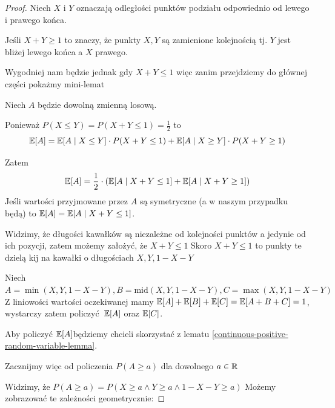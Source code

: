 \begin{proof}
	Niech \(X\) i \(Y\) oznaczają odległości punktów podziału odpowiednio od lewego i prawego końca.

	Jeśli \(X + Y \geq 1\) to znaczy, że punkty \(X, Y\) są zamienione kolejnością tj. \(Y\) jest bliżej lewego końca a \(X\) prawego.

	Wygodniej nam będzie jednak gdy \(X + Y \leq 1\) więc zanim przejdziemy do głównej części pokażmy mini-lemat

	Niech \(A\) będzie dowolną zmienną losową.

	Ponieważ \(P(X \leq Y) = P(X + Y \leq 1) = \frac{1}{2} \) to
	\[
		\expected{A} =
		\expected{A \mid X \leq Y} \cdot P(X + Y \leq 1) +
		\expected{A \mid X \geq Y} \cdot P(X + Y \geq 1)
	\]

	Zatem
	\[
		\expected{A} = \frac{1}{2} \cdot \pars{\expected{A \mid X + Y \leq 1} + \expected{A \mid X + Y \geq 1}}
	\]
	Jeśli wartości przyjmowane przez \(A\) są symetryczne (a w naszym przypadku będą)
	to \( \expected{A} = \expected{A \mid X + Y \leq 1} \).


	Widzimy, że długości kawałków są niezależne od kolejności punktów a jedynie od ich pozycji,
	zatem możemy założyć, że \(X + Y \leq 1\)
	Skoro \(X + Y \leq 1\) to punkty te dzielą kij na kawałki o długościach \(X, Y, 1 - X - Y\)


	Niech \(A = \min(X, Y, 1 - X - Y), B = \text{mid}(X, Y, 1 - X - Y), C = \max(X, Y, 1 - X - Y)\)
	Z liniowości wartości oczekiwanej mamy \(\expected{A} + \expected{B} + \expected{C} = \expected{A + B + C} = 1\),
	wystarczy zatem policzyć \(\expected{A}\) oraz \(\expected{C}\).

	Aby policzyć \(\expected{A}\)będziemy chcieli skorzystać z lematu \ref{continuous-positive-random-variable-lemma}.

	Zacznijmy więc od policzenia \( P(A \geq a) \) dla dowolnego \(a \in \mathbb{R}\)

	Widzimy, że \( P(A \geq a) = P(X \geq a \land Y \geq a \land 1 - X - Y \geq a) \)
	Możemy zobrazować te zależności geometrycznie:


\end{proof}
